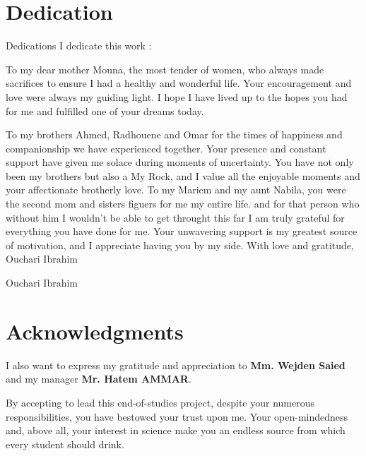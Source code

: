 \documentclass[12pt,a4paper,table]{report}
\begin{document}
\setcounter{chapter}{0}
\setcounter{section}{0}
\setcounter{subsection}{0}
\setcounter{subsubsection}{0}


\setcounter{page}{1}
\chapter*{\centering \LARGE Dedication}

\vspace{1cm}
Dedications
I dedicate this work :

To my dear mother Mouna, the most tender of women, who always made
sacrifices to ensure I had a healthy and wonderful life. Your encouragement and love were
always my guiding light. I hope I have lived up to the hopes you had for me and fulfilled one
of your dreams today.

To my brothers Ahmed, Radhouene and Omar for the times of happiness and companionship we have
experienced together. Your presence and constant support have given me solace during
moments of uncertainty. You have not only been my brothers but also a My Rock, and I
value all the enjoyable moments and your affectionate brotherly love.
To my Mariem and my aunt Nabila, you were the second mom and sisters figuers for me my entire life. and for that person who without him I wouldn't be able to get throught this far I am truly grateful for everything you have done for
me. Your unwavering support is my greatest source of motivation, and I appreciate having
you by my side.
With love and gratitude,
Ouchari Ibrahim

\vspace{1cm}

\noindent \large Ouchari Ibrahim
\thispagestyle{empty}
\chapter*{\centering \LARGE Acknowledgments}

\vspace{1cm}

I also want to express my gratitude and appreciation to \textbf{Mm. Wejden Saied} and my manager \textbf{Mr. Hatem AMMAR}.

By accepting to lead this end-of-studies project, despite your numerous responsibilities, you have bestowed your trust upon me. Your open-mindedness and, above all, your interest in science make you an endless source from which every student should drink.
\end{document}
